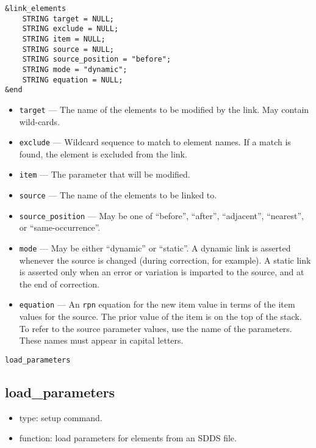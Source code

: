 \documentclass[11pt]{article}
\begin{document}
\begin{verbatim}
&link_elements
    STRING target = NULL;
    STRING exclude = NULL;
    STRING item = NULL;
    STRING source = NULL;
    STRING source_position = "before";
    STRING mode = "dynamic";
    STRING equation = NULL;
&end
\end{verbatim}

\begin{itemize}
\item \verb|target| --- The name of the elements to be modified by the link.  May contain
 wild-cards.
\item \verb|exclude| --- Wildcard sequence to match to element names.  If a match is found,
 the element is excluded from the link.
\item \verb|item| --- The parameter that will be modified.
\item \verb|source| --- The name of the elements to be linked to.
\item \verb|source_position| --- May be one of ``before'', ``after'', 
``adjacent'', ``nearest'', or ``same-occurrence''.
\item \verb|mode| --- May be either ``dynamic'' or ``static''.  A dynamic link
is asserted whenever the source is changed (during correction, for example).  
A static link is asserted only when an error or variation is imparted to
the source, and at the end of correction.
\item \verb|equation| --- An {\tt rpn} equation for the new item value in
terms of the item values for the source.  The prior value of the item is 
on the top of the stack. To refer to the source
parameter values, use the name of the parameters. These names must appear
in capital letters.  
\end{itemize}

\begin{latexonly}
\newpage
\begin{center}{\Large\verb|load_parameters|}\end{center}
\end{latexonly}
\subsection{load\_parameters \label{subsec:loadparameters}}

\begin{itemize}
\item type: setup command.
\item function: load parameters for elements from an SDDS file.
\end{itemize}
\end{document}
